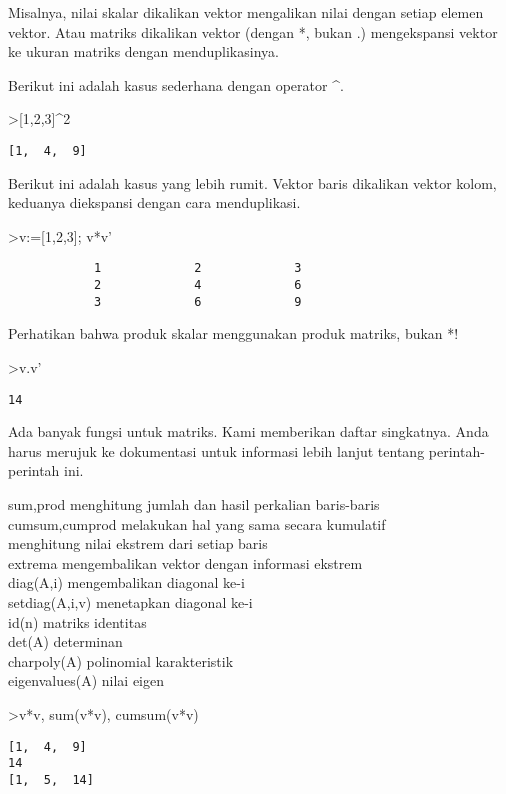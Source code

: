 \documentclass[
]{book}
\begin{document}
Misalnya, nilai skalar dikalikan vektor mengalikan nilai dengan setiap elemen vektor. Atau matriks dikalikan vektor (dengan *, bukan .) mengekspansi vektor ke ukuran matriks dengan menduplikasinya.

Berikut ini adalah kasus sederhana dengan operator \^{}.

\textgreater{[}1,2,3{]}\^{}2

\begin{verbatim}
[1,  4,  9]
\end{verbatim}

Berikut ini adalah kasus yang lebih rumit. Vektor baris dikalikan vektor kolom, keduanya diekspansi dengan cara menduplikasi.

\textgreater v:={[}1,2,3{]}; v*v'

\begin{verbatim}
            1             2             3 
            2             4             6 
            3             6             9 
\end{verbatim}

Perhatikan bahwa produk skalar menggunakan produk matriks, bukan *!

\textgreater v.v'

\begin{verbatim}
14
\end{verbatim}

Ada banyak fungsi untuk matriks. Kami memberikan daftar singkatnya. Anda harus merujuk ke dokumentasi untuk informasi lebih lanjut tentang perintah-perintah ini.

sum,prod menghitung jumlah dan hasil perkalian baris-baris\\
cumsum,cumprod melakukan hal yang sama secara kumulatif\\
menghitung nilai ekstrem dari setiap baris\\
extrema mengembalikan vektor dengan informasi ekstrem\\
diag(A,i) mengembalikan diagonal ke-i\\
setdiag(A,i,v) menetapkan diagonal ke-i\\
id(n) matriks identitas\\
det(A) determinan\\
charpoly(A) polinomial karakteristik\\
eigenvalues(A) nilai eigen

\textgreater v*v, sum(v*v), cumsum(v*v)

\begin{verbatim}
[1,  4,  9]
14
[1,  5,  14]
\end{verbatim}
\end{document}

